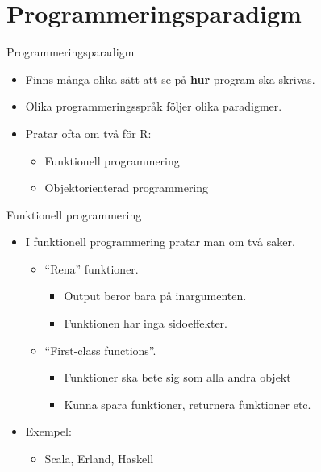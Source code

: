 \documentclass[
  11pt,
  ignorenonframetext,
  handout]{beamer}
\providecommand{\tightlist}{%
  \setlength{\itemsep}{0pt}\setlength{\parskip}{0pt}}
\newcommand\imp[1]{\alert{\textbf{#1}}}
\begin{document}
\section{Programmeringsparadigm}\label{programmeringsparadigm}

\begin{frame}{Programmeringsparadigm}
\protect{}\label{programmeringsparadigm-1}
\begin{itemize}
\item
  Finns många olika sätt att se på \imp{hur} program ska skrivas.
\item
  Olika programmeringsspråk följer olika paradigmer.
\item
  Pratar ofta om två för R:

  \begin{itemize}
  \tightlist
  \item
    Funktionell programmering
  \item
    Objektorienterad programmering
  \end{itemize}
\end{itemize}
\end{frame}

\begin{frame}{Funktionell programmering}
\protect{}\label{funktionell-programmering}
\begin{itemize}
\tightlist
\item
  I funktionell programmering pratar man om två saker.

  \begin{itemize}
  \tightlist
  \item
    ``Rena'' funktioner.

    \begin{itemize}
    \tightlist
    \item
      Output beror bara på inargumenten.
    \item
      Funktionen har inga sidoeffekter.
    \end{itemize}
  \item
    ``First-class functions''.

    \begin{itemize}
    \tightlist
    \item
      Funktioner ska bete sig som alla andra objekt
    \item
      Kunna spara funktioner, returnera funktioner etc.
    \end{itemize}
  \end{itemize}
\item
  Exempel:

  \begin{itemize}
  \tightlist
  \item
    Scala, Erland, Haskell
  \end{itemize}
\end{itemize}
\end{frame}
\end{document}
